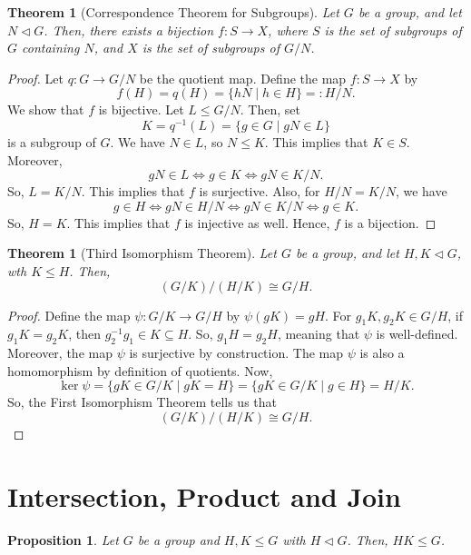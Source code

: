 \documentclass[a4paper, openany]{memoir}
\theoremstyle{definition}
\theoremstyle{plain}
\newtheorem{theorem}[definition]{Theorem}
\newtheorem{proposition}[definition]{Proposition}
\begin{document}
    \begin{theorem}[Correspondence Theorem for Subgroups]
        Let $G$ be a group, and let $N \vartriangleleft G$. Then, there exists a bijection $f: S \to X$, where $S$ is the set of subgroups of $G$ containing $N$, and $X$ is the set of subgroups of $G/N$.
    \end{theorem}
    \begin{proof}
        Let $q: G \to G/N$ be the quotient map. Define the map $f: S \to X$ by 
        \[f(H) = q(H) = \{hN \mid h \in H\} =: H/N.\]
        We show that $f$ is bijective. Let $L \leq G/N$. Then, set 
        \[K = q^{-1}(L) = \{g \in G \mid gN \in L\}\]
        is a subgroup of $G$. We have $N \in L$, so $N \leq K$. This implies that $K \in S$. Moreover,
        \[gN \in L \iff g \in K \iff gN \in K/N.\]
        So, $L = K/N$. This implies that $f$ is surjective. Also, for $H/N = K/N$, we have
        \[g \in H \iff gN \in H/N \iff gN \in K/N \iff g \in K.\]
        So, $H = K$. This implies that $f$ is injective as well. Hence, $f$ is a bijection.
    \end{proof}

    \begin{theorem}[Third Isomorphism Theorem]
        Let $G$ be a group, and let $H, K \vartriangleleft G$, wth $K \leq H$. Then,
        \[(G/K)/(H/K) \cong G/H.\]
    \end{theorem}
    \begin{proof}
        Define the map $\psi: G/K \to G/H$ by $\psi(gK) = gH$. For $g_1K, g_2K \in G/H$, if $g_1K = g_2K$, then $g_2^{-1}g_1 \in K \subseteq H$. So, $g_1H = g_2H$, meaning that $\psi$ is well-defined. Moreover, the map $\psi$ is surjective by construction. The map $\psi$ is also a homomorphism by definition of quotients. Now,
        \[\ker \psi = \{gK \in G/K \mid gK = H\} = \{gK \in G/K \mid g \in H\} = H/K.\]
        So, the First Isomorphism Theorem tells us that
        \[(G/K)/(H/K) \cong G/H.\]
    \end{proof}

    \newpage

    \section{Intersection, Product and Join}
    \begin{proposition}
        Let $G$ be a group and $H, K \leq G$ with $H \vartriangleleft G$. Then, $HK \leq G$.
    \end{proposition}
\end{document}
